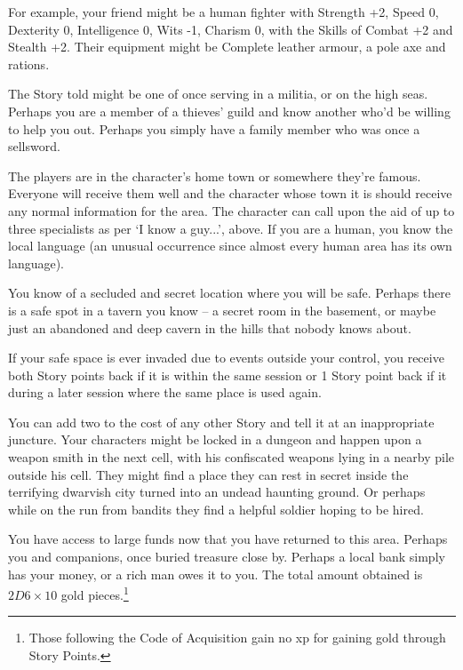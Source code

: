 \begin{multicols}{2}
For example, your friend might be a human fighter with Strength +2, Speed 0, Dexterity 0, Intelligence 0, Wits -1, Charism 0, with the Skills of Combat +2 and Stealth +2. Their equipment might be Complete leather armour, a pole axe and rations.

The Story told might be one of once serving in a militia, or on the high seas. Perhaps you are a member of a thieves' guild and know another who'd be willing to help you out. Perhaps you simply have a family member who was once a sellsword.

The players are in the character's home town or somewhere they're famous. Everyone will receive them well and the character whose town it is should receive any normal information for the area. The character can call upon the aid of up to three specialists as per `I know a guy...', above. If you are a human, you know the local language (an unusual occurrence since almost every human area has its own language).

You know of a secluded and secret location where you will be safe. Perhaps there is a safe spot in a tavern you know -- a secret room in the basement, or maybe just an abandoned and deep cavern in the hills that nobody knows about.

If your safe space is ever invaded due to events outside your control, you receive both Story points back if it is within the same session or 1 Story point back if it during a later session where the same place is used again.

You can add two to the cost of any other Story and tell it at an inappropriate juncture. Your characters might be locked in a dungeon and happen upon a weapon smith in the next cell, with his confiscated weapons lying in a nearby pile outside his cell. They might find a place they can rest in secret inside the terrifying dwarvish city turned into an undead haunting ground. Or perhaps while on the run from bandits they find a helpful soldier hoping to be hired.

You have access to large funds now that you have returned to this area.
Perhaps you and companions, once buried treasure close by.
Perhaps a local bank simply has your money, or a rich man owes it to you.
The total amount obtained is $2D6 \times 10$ gold pieces.\footnote{Those following the Code of Acquisition gain no \gls{xp} for gaining gold through Story Points.}


\end{multicols}
